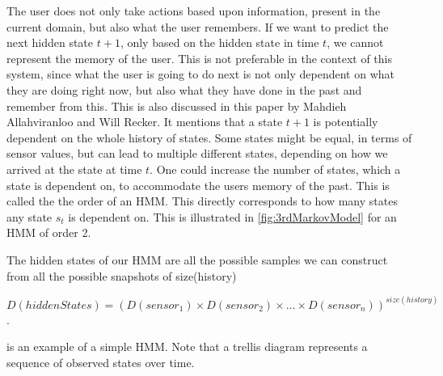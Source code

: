 The user does not only take actions based upon information, present in the current domain, but also what the user remembers. If we want to predict the next hidden state $t+1$, only based on the hidden state in time $t$, we cannot represent the memory of the user. This is not preferable in the context of this system, since what the user is going to do next is not only dependent on what they are doing right now, but also what they have done in the past and remember from this. This is also discussed in this paper\cite{Allahviranloo201316} by Mahdieh Allahviranloo and Will Recker. It mentions that a state $t+1$ is potentially dependent on the whole history of states. Some states might be equal, in terms of sensor values, but can lead to multiple different states, depending on how we arrived at the state at time $t$. One could increase the number of states, which a state is dependent on, to accommodate the users memory of the past. This is called the the order of an HMM. This directly corresponds to how many states any state $s_t$ is dependent on. This is illustrated in \cref{fig:3rdMarkovModel} for an HMM of order 2.

The hidden states of our HMM are all the possible samples we can construct from all the possible snapshots of size(history)

$D(hiddenStates) = (D(sensor_1)\times D(sensor_2)\times ... \times D(sensor_n))^{size(history)}$.

 is an example of a simple HMM. Note that a trellis diagram represents a sequence of observed states over time.

